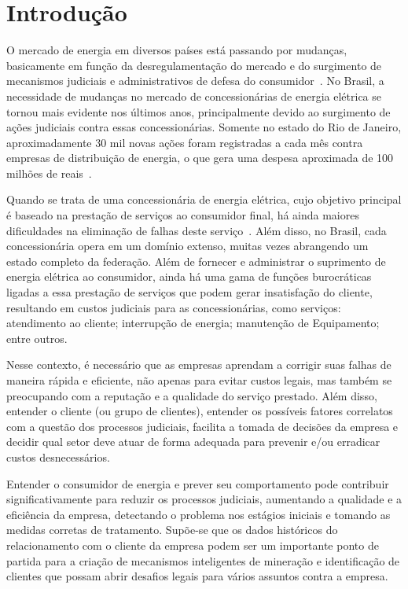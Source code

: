 \documentclass[../main.tex]{subfiles}
\begin{document}

\chapter{Introdução}

O mercado de energia em diversos países está passando por mudanças, basicamente em função da desregulamentação do mercado e do surgimento de mecanismos judiciais e administrativos de defesa do consumidor~\cite{ibanez2006antecedents}. No Brasil, a necessidade de mudanças no mercado de concessionárias de energia elétrica se tornou mais evidente nos últimos anos, principalmente devido ao surgimento de ações judiciais contra essas concessionárias. Somente no estado do Rio de Janeiro, aproximadamente 30 mil novas ações foram registradas a cada mês contra empresas de distribuição de energia, o que gera uma despesa aproximada de 100 milhões de reais~\cite{almeida2014propensao}.


Quando se trata de uma concessionária de energia elétrica, cujo objetivo principal é baseado na prestação de serviços ao consumidor final, há ainda maiores dificuldades na eliminação de falhas deste serviço~\cite{johnston1999service}. Além disso, no Brasil, cada concessionária opera em um domínio extenso, muitas vezes abrangendo um estado completo da federação. Além de fornecer e administrar o suprimento de energia elétrica ao consumidor, ainda há uma gama de funções burocráticas ligadas a essa prestação de serviços que podem gerar insatisfação do cliente, resultando em custos judiciais para as concessionárias, como serviços: atendimento ao cliente; interrupção de energia; manutenção de Equipamento; entre outros.

Nesse contexto, é necessário que as empresas aprendam a corrigir suas falhas de maneira rápida e eficiente, não apenas para evitar custos legais, mas também se preocupando com a reputação e a qualidade do serviço prestado. Além disso, entender o cliente (ou grupo de clientes), entender os possíveis fatores correlatos com a questão dos processos judiciais, facilita a tomada de decisões da empresa e decidir qual setor deve atuar de forma adequada para prevenir e/ou erradicar custos desnecessários.


Entender o consumidor de energia e prever seu comportamento pode contribuir significativamente para reduzir os processos judiciais, aumentando a qualidade e a eficiência da empresa, detectando o problema nos estágios iniciais e tomando as medidas corretas de tratamento. Supõe-se que os dados históricos do relacionamento com o cliente da empresa podem ser um importante ponto de partida para a criação de mecanismos inteligentes de mineração e identificação de clientes que possam abrir desafios legais para vários assuntos contra a empresa.
\end{document}
